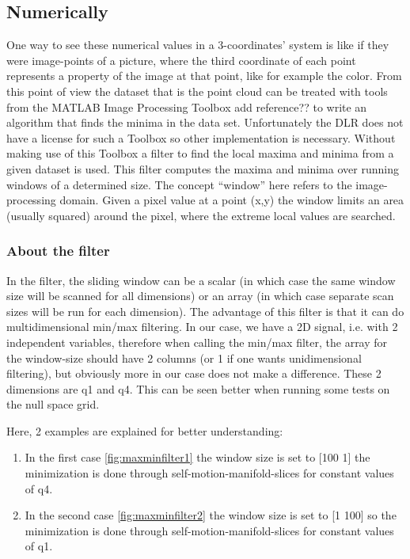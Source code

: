 
\subsection{Numerically}
One way to see these numerical values in a 3-coordinates' system is like if they were image-points of a picture, where the third coordinate of each point represents a property of the image at that point, like for example the color. From this point of view the dataset that is the point cloud can be treated with tools from the MATLAB Image Processing Toolbox {\color{red} add reference?? } to write an algorithm that finds the minima in the data set. Unfortunately the DLR does not have a license for such a Toolbox so other implementation is necessary.
Without making use of this Toolbox a filter \cite{minmaxfilter} to find the local maxima and minima from a given dataset is used. This filter computes the maxima and minima over running windows of a determined size. The concept “window” here refers to the image-processing domain. Given a pixel value at a point (x,y) the window limits an area (usually squared) around the pixel, where the extreme local values are searched.

\subsubsection{About the filter}
In the filter, the sliding window can be a scalar (in which case the same window size will be scanned for all dimensions) or an array (in which case separate scan sizes will be run for each dimension). The advantage of this filter is that it can do multidimensional min/max filtering. In our case, we have a 2D signal, i.e. with 2 independent variables, therefore when calling the min/max filter, the array for the window-size should have 2 columns (or 1 if one wants unidimensional filtering), but obviously more in our case does not make a difference.
These 2 dimensions are q1 and q4. This can be seen better when running some tests on the null space grid.

Here, 2 examples are explained for better understanding:
\begin{enumerate}
	\item In the first case \ref{fig:maxminfilter1} the window size is set to [100 1] the minimization is done through self-motion-manifold-slices for constant values of q4.
	\item In the second case \ref{fig:maxminfilter2} the window size is set to [1 100] so the minimization is done through self-motion-manifold-slices for constant values of q1.

\end{enumerate}

